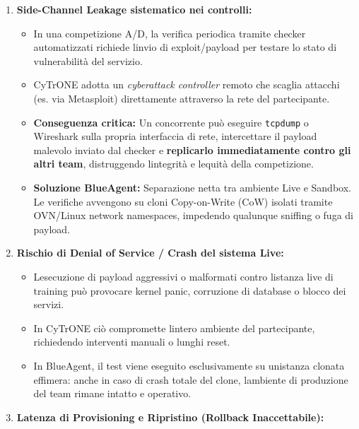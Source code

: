 \begin{enumerate}
\def\labelenumi{\arabic{enumi}.}
\item
  \textbf{Side-Channel Leakage sistematico nei controlli:}

  \begin{itemize}
  \tightlist
  \item
    In una competizione A/D, la verifica periodica tramite checker
    automatizzati richiede l\textquotesingle invio di exploit/payload
    per testare lo stato di vulnerabilità del servizio.
  \item
    CyTrONE adotta un \emph{cyberattack controller} remoto che scaglia
    attacchi (es. via Metasploit) direttamente attraverso la rete del
    partecipante.
  \item
    \textbf{Conseguenza critica:} Un concorrente può eseguire
    \passthrough{\lstinline!tcpdump!} o Wireshark sulla propria
    interfaccia di rete, intercettare il payload malevolo inviato dal
    checker e \textbf{replicarlo immediatamente contro gli altri team},
    distruggendo l\textquotesingle integrità e l\textquotesingle equità
    della competizione.
  \item
    \textbf{Soluzione BlueAgent:} Separazione netta tra ambiente Live e
    Sandbox. Le verifiche avvengono su cloni Copy-on-Write (CoW) isolati
    tramite OVN/Linux network namespaces, impedendo qualunque sniffing o
    fuga di payload.
  \end{itemize}
\item
  \textbf{Rischio di Denial of Service / Crash del sistema Live:}

  \begin{itemize}
  \tightlist
  \item
    L\textquotesingle esecuzione di payload aggressivi o malformati
    contro l\textquotesingle istanza live di training può provocare
    kernel panic, corruzione di database o blocco dei servizi.
  \item
    In CyTrONE ciò compromette l\textquotesingle intero ambiente del
    partecipante, richiedendo interventi manuali o lunghi reset.
  \item
    In BlueAgent, il test viene eseguito esclusivamente su
    un\textquotesingle istanza clonata effimera: anche in caso di crash
    totale del clone, l\textquotesingle ambiente di produzione del team
    rimane intatto e operativo.
  \end{itemize}
\item
  \textbf{Latenza di Provisioning e Ripristino (Rollback
  Inaccettabile):}


\end{enumerate}
